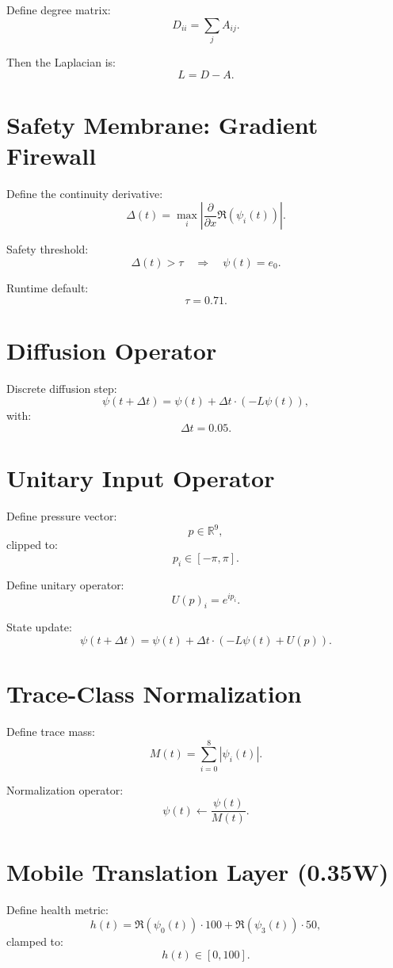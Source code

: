 \documentclass[12pt]{article}
\begin{document}
Define degree matrix:
\[
D_{ii} = \sum_j A_{ij}.
\]

Then the Laplacian is:
\[
L = D - A.
\]

\section{Safety Membrane: Gradient Firewall}

Define the continuity derivative:
\[
\Delta(t) = \max_i \left| \frac{\partial}{\partial x} \Re(\psi_i(t)) \right|.
\]

Safety threshold:
\[
\Delta(t) > \tau \quad \Rightarrow \quad \psi(t) = e_0.
\]

Runtime default:
\[
\tau = 0.71.
\]

\section{Diffusion Operator}

Discrete diffusion step:
\[
\psi(t + \Delta t) = \psi(t) + \Delta t \cdot (-L \psi(t)),
\]
with:
\[
\Delta t = 0.05.
\]

\section{Unitary Input Operator}

Define pressure vector:
\[
p \in \mathbb{R}^9,
\]
clipped to:
\[
p_i \in [-\pi, \pi].
\]

Define unitary operator:
\[
U(p)_i = e^{i p_i}.
\]

State update:
\[
\psi(t + \Delta t) = \psi(t) + \Delta t \cdot (-L\psi(t) + U(p)).
\]

\section{Trace-Class Normalization}

Define trace mass:
\[
M(t) = \sum_{i=0}^8 |\psi_i(t)|.
\]

Normalization operator:
\[
\psi(t) \leftarrow \frac{\psi(t)}{M(t)}.
\]

\section{Mobile Translation Layer (0.35W)}

Define health metric:
\[
h(t) = \Re(\psi_0(t)) \cdot 100 + \Re(\psi_3(t)) \cdot 50,
\]
clamped to:
\[
h(t) \in [0, 100].
\]
\end{document}

